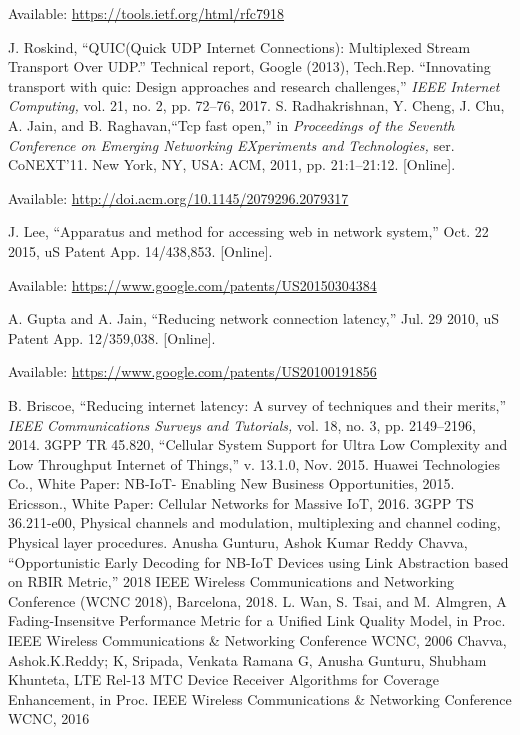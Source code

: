 \begin{multicols}{2}
{\begin{thebibliography}{99}
Available: \url{https://tools.ietf.org/html/rfc7918}

 J. Roskind, “QUIC(Quick UDP Internet Connections): Multiplexed Stream Transport Over UDP.” Technical report, Google (2013), Tech.Rep.
 “Innovating transport with quic: Design approaches and research challenges,” \textit{IEEE Internet Computing,} vol. 21, no. 2, pp. 72–76, 2017.
 S. Radhakrishnan, Y. Cheng, J. Chu, A. Jain, and B. Raghavan,“Tcp fast open,” in \textit{Proceedings of the Seventh Conference on Emerging Networking EXperiments and Technologies,} ser. CoNEXT’11. New York, NY, USA: ACM, 2011, pp. 21:1–21:12. [Online].

Available: \url{http://doi.acm.org/10.1145/2079296.2079317}

 J. Lee, “Apparatus and method for accessing web in network system,” Oct. 22 2015, uS Patent App. 14/438,853. [Online].

Available: \url{https://www.google.com/patents/US20150304384}

 A. Gupta and A. Jain, “Reducing network connection latency,” Jul. 29 2010, uS Patent App. 12/359,038. [Online]. 

Available: \url{https://www.google.com/patents/US20100191856}

 B. Briscoe, “Reducing internet latency: A survey of techniques and their merits,” \textit{IEEE Communications Surveys and Tutorials,} vol. 18, no. 3, pp. 2149–2196, 2014.
 3GPP TR 45.820, ``Cellular System Support for Ultra Low Complexity and Low Throughput Internet of Things,” v. 13.1.0, Nov. 2015.
 Huawei Technologies Co., White Paper: NB-IoT- Enabling New Business Opportunities, 2015.
 Ericsson., White Paper: Cellular Networks for Massive IoT, 2016.
 3GPP TS 36.211-e00, Physical channels and modulation, multiplexing and channel coding, Physical layer procedures. 
 Anusha Gunturu, Ashok Kumar Reddy Chavva, “Opportunistic Early Decoding for NB-IoT Devices using Link Abstraction based on RBIR Metric,” 2018 IEEE Wireless Communications and Networking Conference (WCNC 2018), Barcelona, 2018. 
 L. Wan, S. Tsai, and M. Almgren, A Fading-Insensitve Performance Metric for a Unified Link Quality Model, in Proc. IEEE Wireless Communications \& Networking Conference WCNC, 2006 
 Chavva, Ashok.K.Reddy; K, Sripada, Venkata Ramana G, Anusha Gunturu, Shubham Khunteta, LTE Rel-13 MTC Device Receiver Algorithms for Coverage Enhancement, in Proc. IEEE Wireless Communications \& Networking Conference WCNC, 2016
\end{thebibliography}
}\relax
\end{multicols}

